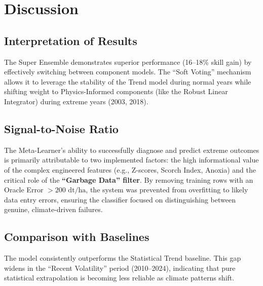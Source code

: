\section{Discussion}

\subsection{Interpretation of Results}
The Super Ensemble demonstrates superior performance (16--18\% skill gain) by effectively switching between component models. The ``Soft Voting'' mechanism allows it to leverage the stability of the Trend model during normal years while shifting weight to Physics-Informed components (like the Robust Linear Integrator) during extreme years (2003, 2018).

\subsection{Signal-to-Noise Ratio}
The Meta-Learner's ability to successfully diagnose and predict extreme outcomes is primarily attributable to two implemented factors: the high informational value of the complex engineered features (e.g., Z-scores, Scorch Index, Anoxia) and the critical role of the \textbf{``Garbage Data'' filter}. By removing training rows with an Oracle Error $> 200 \text{ dt/ha}$, the system was prevented from overfitting to likely data entry errors, ensuring the classifier focused on distinguishing between genuine, climate-driven failures.

\subsection{Comparison with Baselines}
The model consistently outperforms the Statistical Trend baseline. This gap widens in the ``Recent Volatility'' period (2010--2024), indicating that pure statistical extrapolation is becoming less reliable as climate patterns shift.
